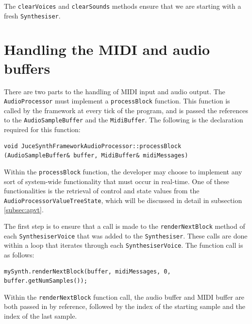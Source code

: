 \documentclass[a4paper,12pt]{report}
\begin{document}
The \texttt{clear\-Voices} and \texttt{clear\-Sounds} methods ensure that we are starting with a fresh \texttt{Synthesiser}.

\section{Handling the MIDI and audio buffers}
\label{sec:handlingbuffers}
There are two parts to the handling of MIDI input and audio output. The \texttt{Audio\-Processor} must implement a \texttt{process\-Block} function. This function is called by the framework at every tick of the program, and is passed the references to the \texttt{Audio\-Sample\-Buffer} and the \texttt{Midi\-Buffer}. The following is the declaration required for this function:

 \noindent\begin{minipage}{\linewidth} \begin{lstlisting}[caption={\texttt{processBlock} Declaration},label={code:processblockdeclaration},captionpos=b]
void JuceSynthFrameworkAudioProcessor::processBlock (AudioSampleBuffer& buffer, MidiBuffer& midiMessages)
\end{lstlisting} \end{minipage}

Within the \texttt{process\-Block} function, the developer may choose to implement any sort of system-wide functionality that must occur in real-time. One of these functionalities is the retrieval of control and state values from the \texttt{Audio\-Processor\-Value\-Tree\-State}, which will be discussed in detail in subsection \ref{subsec:apvt}.

The first step is to ensure that a call is made to the \texttt{render\-Next\-Block} method of each \texttt{Synthesiser\-Voice} that was added to the \texttt{Synthesiser}. These calls are done within a loop that iterates through each \texttt{Synthesiser\-Voice}. The function call is as follows: 

 \noindent\begin{minipage}{\linewidth} \begin{lstlisting}[caption={\texttt{renderNextBlock} function call},label={code:rendernextblockfunccall},captionpos=b]
mySynth.renderNextBlock(buffer, midiMessages, 0, buffer.getNumSamples());
\end{lstlisting} \end{minipage}

Within the \texttt{renderNextBlock} function call, the audio buffer and MIDI buffer are both passed in by reference, followed by the index of the starting sample and the index of the last sample.
\end{document}

